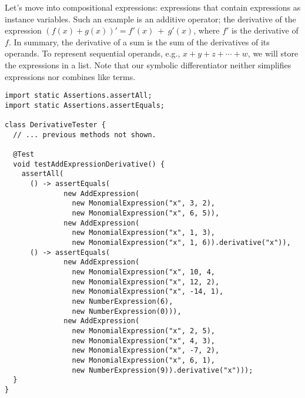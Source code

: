 Let's move into compositional expressions: expressions that contain expressions as instance variables. Such an example is an additive operator; the derivative of the expression $(f(x) + g(x))' = f'(x)~+~g'(x)$, where $f'$ is the derivative of $f$. In summary, the derivative of a sum is the sum of the derivatives of its operands. To represent sequential operands, e.g., $x + y + z + \cdots + w$, we will store the expressions in a list. Note that our symbolic differentiator neither simplifies expressions nor combines like terms.

\begin{lstlisting}[language=MyJava]
import static Assertions.assertAll;
import static Assertions.assertEquals;
  
class DerivativeTester {
  // ... previous methods not shown.

  @Test
  void testAddExpressionDerivative() {
    assertAll(
      () -> assertEquals(
              new AddExpression(
                new MonomialExpression("x", 3, 2),
                new MonomialExpression("x", 6, 5)),
              new AddExpression(
                new MonomialExpression("x", 1, 3),
                new MonomialExpression("x", 1, 6)).derivative("x")),
      () -> assertEquals(
              new AddExpression(
                new MonomialExpression("x", 10, 4,
                new MonomialExpression("x", 12, 2),
                new MonomialExpression("x", -14, 1),
                new NumberExpression(6),
                new NumberExpression(0))),
              new AddExpression(
                new MonomialExpression("x", 2, 5),
                new MonomialExpression("x", 4, 3),
                new MonomialExpression("x", -7, 2),
                new MonomialExpression("x", 6, 1),
                new NumberExpression(9)).derivative("x")));
  }
}
\end{lstlisting}


